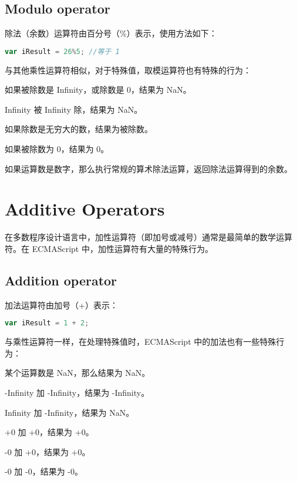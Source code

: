 \section{Modulo operator}

除法（余数）运算符由百分号（\%）表示，使用方法如下：


\begin{lstlisting}[language=JavaScript]
var iResult = 26%5; //等于 1
\end{lstlisting}

与其他乘性运算符相似，对于特殊值，取模运算符也有特殊的行为：

\begin{compactitem}
\item 如果被除数是 Infinity，或除数是 0，结果为 NaN。
\item Infinity 被 Infinity 除，结果为 NaN。
\item 如果除数是无穷大的数，结果为被除数。
\item 如果被除数为 0，结果为 0。
\end{compactitem}

如果运算数是数字，那么执行常规的算术除法运算，返回除法运算得到的余数。




\chapter{Additive Operators}


在多数程序设计语言中，加性运算符（即加号或减号）通常是最简单的数学运算符。在 ECMAScript 中，加性运算符有大量的特殊行为。

\section{Addition operator}

加法运算符由加号（+）表示：

\begin{lstlisting}[language=JavaScript]
var iResult = 1 + 2;
\end{lstlisting}

与乘性运算符一样，在处理特殊值时，ECMAScript 中的加法也有一些特殊行为：

\begin{compactitem}
\item 某个运算数是 NaN，那么结果为 NaN。
\item -Infinity 加 -Infinity，结果为 -Infinity。
\item Infinity 加 -Infinity，结果为 NaN。
\item +0 加 +0，结果为 +0。
\item -0 加 +0，结果为 +0。
\item -0 加 -0，结果为 -0。
\end{compactitem}

